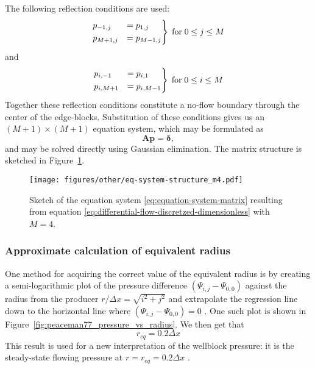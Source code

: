 The following reflection conditions are used:
\begin{equation}
    \begin{rcases}
        p_{-1,j} &= p_{1,j} \\
        p_{M+1,j} &= p_{M-1,j}
    \end{rcases} \; \mathrm{for} \; 0\leq j \leq M
\end{equation}
and
\begin{equation}
    \begin{rcases}
        p_{i,-1} &= p_{i,1} \\
        p_{i,M+1} &= p_{i,M-1}
    \end{rcases} \; \mathrm{for} \; 0\leq i \leq M
\end{equation}
Together these reflection conditions constitute a no-flow boundary through the center of the edge-blocks. Substitution of these conditions gives us an $(M+1)\times (M+1)$ equation system, which may be formulated as
\begin{equation}
    \label{eq:equation-system-matrix}
    \mathbf{Ap}=\boldsymbol{\delta},
\end{equation}
and may be solved directly using Gaussian elimination. The matrix structure is sketched in Figure~\ref{fig:matrix-structure}.

\begin{figure}[htbp]
    \centering
    \texttt{[image: figures/other/eq-system-structure\_m4.pdf]}
    \caption{Sketch of the equation system \eqref{eq:equation-system-matrix} resulting from equation \eqref{eq:differential-flow-discretzed-dimensionless} with $M=4$.}
    \label{fig:matrix-structure}
\end{figure}


\subsubsection{Approximate calculation of equivalent radius} %
\label{ssub:approximate_calculation_of_equivalent_radius}
One method for acquiring the correct value of the equivalent radius is by creating a semi-logarithmic plot of the pressure difference $(\Psi_{i,j}-\Psi_{0,0})$ against the radius from the producer $r/\Delta x=\sqrt{i^2+j^2}$ and extrapolate the regression line down to the horizontal line where $(\Psi_{i,j}-\Psi_{0,0})=0$ \cite{Peaceman1978Interpretation}. One such plot is shown in Figure~\ref{fig:peaceman77_pressure_vs_radius}. We then get that
\begin{equation}
    r_{eq} = 0.2 \Delta x
\end{equation}
This result is used for a new interpretation of the wellblock pressure: it is the steady-state flowing pressure at $r=r_{eq}=0.2 \Delta x$ \cite{Peaceman1978Interpretation}.

